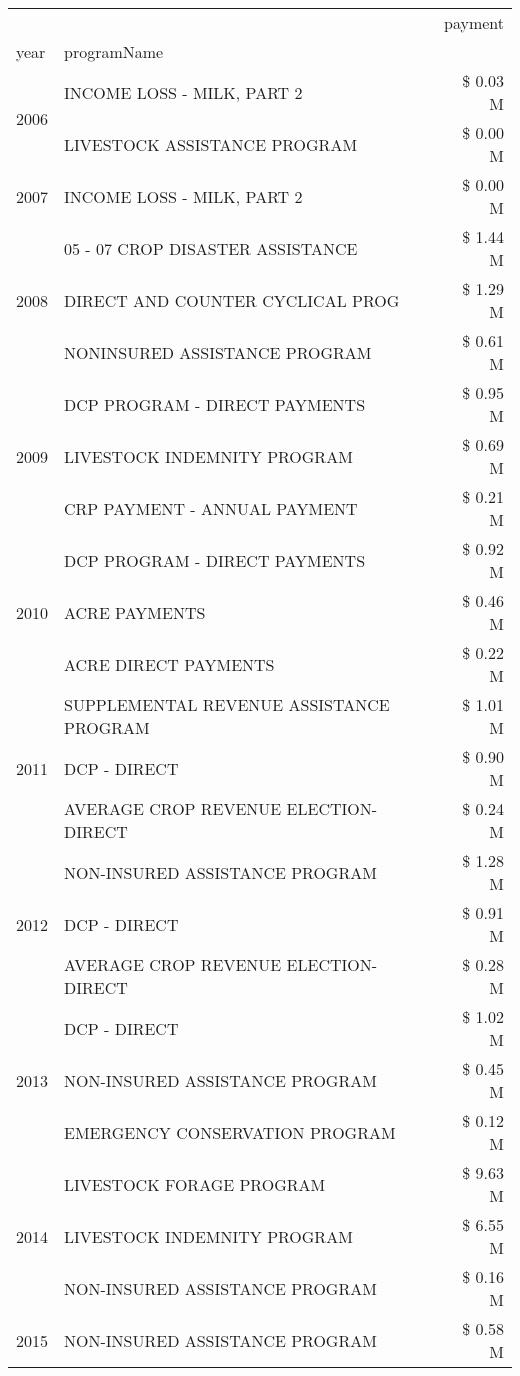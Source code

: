 \begin{tabular}{llr}
\toprule
 &  & payment \\
year & programName &  \\
\midrule
\multirow[t]{2}{*}{2006} & INCOME LOSS - MILK, PART 2 & \$ 0.03 M \\
 & LIVESTOCK ASSISTANCE PROGRAM & \$ 0.00 M \\
\cline{1-3}
2007 & INCOME LOSS - MILK, PART 2 & \$ 0.00 M \\
\cline{1-3}
\multirow[t]{3}{*}{2008} & 05 - 07 CROP DISASTER ASSISTANCE & \$ 1.44 M \\
 & DIRECT AND COUNTER CYCLICAL PROG & \$ 1.29 M \\
 & NONINSURED ASSISTANCE PROGRAM & \$ 0.61 M \\
\cline{1-3}
\multirow[t]{3}{*}{2009} & DCP PROGRAM - DIRECT PAYMENTS & \$ 0.95 M \\
 & LIVESTOCK INDEMNITY PROGRAM & \$ 0.69 M \\
 & CRP PAYMENT - ANNUAL PAYMENT & \$ 0.21 M \\
\cline{1-3}
\multirow[t]{3}{*}{2010} & DCP PROGRAM - DIRECT PAYMENTS & \$ 0.92 M \\
 & ACRE PAYMENTS & \$ 0.46 M \\
 & ACRE DIRECT PAYMENTS & \$ 0.22 M \\
\cline{1-3}
\multirow[t]{3}{*}{2011} & SUPPLEMENTAL REVENUE ASSISTANCE PROGRAM & \$ 1.01 M \\
 & DCP - DIRECT & \$ 0.90 M \\
 & AVERAGE CROP REVENUE ELECTION-DIRECT & \$ 0.24 M \\
\cline{1-3}
\multirow[t]{3}{*}{2012} & NON-INSURED ASSISTANCE PROGRAM & \$ 1.28 M \\
 & DCP - DIRECT & \$ 0.91 M \\
 & AVERAGE CROP REVENUE ELECTION-DIRECT & \$ 0.28 M \\
\cline{1-3}
\multirow[t]{3}{*}{2013} & DCP - DIRECT & \$ 1.02 M \\
 & NON-INSURED ASSISTANCE PROGRAM & \$ 0.45 M \\
 & EMERGENCY CONSERVATION PROGRAM & \$ 0.12 M \\
\cline{1-3}
\multirow[t]{3}{*}{2014} & LIVESTOCK FORAGE PROGRAM & \$ 9.63 M \\
 & LIVESTOCK INDEMNITY PROGRAM & \$ 6.55 M \\
 & NON-INSURED ASSISTANCE PROGRAM & \$ 0.16 M \\
\cline{1-3}
\multirow[t]{3}{*}{2015} & NON-INSURED ASSISTANCE PROGRAM & \$ 0.58 M \\

\end{tabular}
